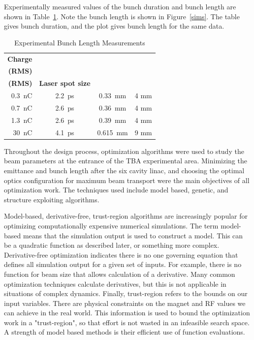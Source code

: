 Experimentally measured values of the bunch duration and bunch length are shown in Table~\ref{exp}.
Note the bunch length is shown in Figure~\ref{sims}. 
The table gives bunch duration, and the plot gives bunch length for the same data.
\begin{table}[h]
	\centering
	\caption{Experimental Bunch Length Measurements}
	\begin{tabular}{rccc}
		\toprule
		\toprule
		\textbf{Charge} & \thead{\textbf{Bunch Dur.}\\ \textbf{(RMS)}} & \thead{\textbf{Bunch Length}\\\textbf{(RMS)}} & \textbf{Laser spot size}  \\
		\midrule
		\SI{0.3}{nC} & \SI{2.2}{ps} &  \SI{0.33}{mm} & 4 mm    \\ %
		\SI{0.7}{nC} & \SI{2.6}{ps} &  \SI{0.36}{mm} & 4 mm   \\ %
		\SI{1.3}{nC} & \SI{2.6}{ps} &  \SI{0.39}{mm} & 4 mm    \\
		\SI{30}{nC}  & \SI{4.1}{ps} &  \SI{0.615}{mm} & 9 mm \\ %
		\bottomrule
	\end{tabular}
	\label{exp}
\end{table}

 \label{sec:opt}

Throughout the design process, optimization algorithms 
were used to study the beam parameters at the entrance of the TBA experimental area.
Minimizing the emittance and bunch length after the six cavity linac,
and choosing the optimal optics configuration for maximum beam transport 
were the main objectives of all optimization work.
The techniques used include model based, genetic,
and structure exploiting algorithms. 
 
Model-based, derivative-free, trust-region algorithms 
are increasingly popular for optimizing computationally 
expensive numerical simulations. The term model-based means 
that the simulation output is used to construct a model. 
This can be a quadratic function as described later, 
or something more complex.
Derivative-free optimization indicates there is no one 
governing equation that defines all simulation output
for a given set of inputs. For example, there is no 
function for beam size that allows calculation of a derivative. 
Many common optimization techniques calculate derivatives, 
but this is not applicable in situations of complex dynamics.
Finally, trust-region refers to the bounds on our input variables.
There are physical constraints on the magnet and RF values we 
can achieve in the real world. This information is used 
to bound the optimization work in a "trust-region", so that
effort is not wasted in an infeasible search space.
A strength of model based methods is their efficient use of function evaluations. 

